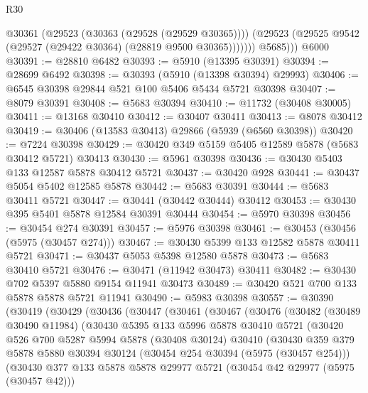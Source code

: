 \begin{lexlean}{R30}
\begin{coremodule}
            @30361
              (@29523 (@30363 (@29528 (@29529 @30365))))
              (@29523 (@29525 @9542 (@29527 (@29422 @30364) (@28819 @9500 @30365)))))))
          @5685)))
    @6000
@30391 := @28810 @6482
@30393 := @5910 (@13395 @30391)
@30394 := @28699 @6492
@30398 := @30393 (@5910 (@13398 @30394) @29993)
@30406 := @6545 @30398 @29844 @521 @100 @5406 @5434 @5721 @30398
@30407 := @8079 @30391
@30408 := @5683 @30394
@30410 := @11732 (@30408 @30005)
@30411 := @13168 @30410
@30412 := @30407 @30411
@30413 := @8078 @30412
@30419 := @30406 (@13583 @30413) @29866 (@5939 (@6560 @30398))
@30420 := @7224 @30398
@30429 := @30420 @349 @5159 @5405 @12589 @5878 (@5683 @30412 @5721) @30413
@30430 := @5961 @30398
@30436 := @30430 @5403 @133 @12587 @5878 @30412 @5721
@30437 := @30420 @928
@30441 := @30437 @5054 @5402 @12585 @5878
@30442 := @5683 @30391
@30444 := @5683 @30411 @5721
@30447 := @30441 (@30442 @30444) @30412
@30453 := @30430 @395 @5401 @5878 @12584 @30391 @30444
@30454 := @5970 @30398
@30456 := @30454 @274 @30391
@30457 := @5976 @30398
@30461 := @30453 (@30456 (@5975 (@30457 @274)))
@30467 := @30430 @5399 @133 @12582 @5878 @30411 @5721
@30471 := @30437 @5053 @5398 @12580 @5878
@30473 := @5683 @30410 @5721
@30476 := @30471 (@11942 @30473) @30411
@30482 := @30430 @702 @5397 @5880 @9154 @11941 @30473
@30489 := @30420 @521 @700 @133 @5878 @5878 @5721 @11941
@30490 := @5983 @30398
@30557 := @30390
    (@30419
      (@30429
        (@30436
          (@30447
            (@30461
              (@30467
                (@30476
                  (@30482
                    (@30489 @30490 @11984)
                    (@30430
                      @5395
                      @133
                      @5996
                      @5878
                      @30410
                      @5721
                      (@30420
                        @526
                        @700
                        @5287
                        @5994
                        @5878
                        (@30408 @30124)
                        @30410
                        (@30430
                          @359
                          @379
                          @5878
                          @5880
                          @30394
                          @30124
                          (@30454 @254 @30394 (@5975 (@30457 @254)))
                          (@30430
                            @377
                            @133
                            @5878
                            @5878
                            @29977
                            @5721
                            (@30454 @42 @29977 (@5975 (@30457 @42)))

\end{coremodule}
\end{lexlean}
